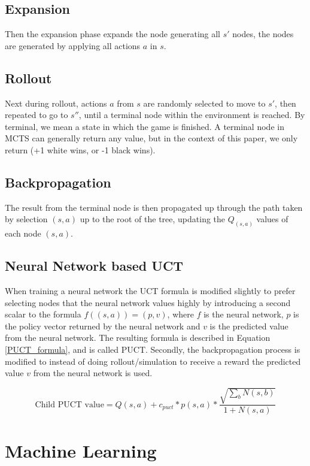 \subsection*{Expansion}
Then the expansion phase expands the node generating all $s'$ nodes, the nodes are generated by applying all actions $a$ in $s$.

\subsection*{Rollout}
Next during rollout, actions $a$ from $s$ are randomly selected to move to $s'$, then repeated to go to $s''$, until a terminal node within the environment is reached. By terminal, we mean a state in which the game is finished. A terminal node in MCTS can generally return any value, but in the context of this paper, we only return (+1 white wins, or -1 black wins).


\subsection*{Backpropagation}
The result from the terminal node is then propagated up through the path taken by selection $(s,a)$ up
to the root of the tree, updating the $Q_{(s,a)}$ values of each node $(s,a)$.

\subsection{Neural Network based UCT}

When training a neural network the UCT formula is modified slightly to prefer selecting nodes
that the neural network values highly by introducing a second scalar to the formula $f((s,a)) = (p,v)$, where $f$ is the neural network, $p$ is the policy vector returned by the neural network and $v$ is the predicted value from the neural network. The resulting formula is described in Equation \ref{PUCT_formula}, and is called PUCT\cite{rosin:puct}. Secondly, the backpropagation process is modified to instead of doing rollout/simulation to receive a reward the predicted value $v$ from the neural network is used.

\begin{equation} \label{PUCT_formula}
	\text{Child PUCT value} = Q(s,a) + c_{puct} * p(s,a) * \frac{\sqrt{\sum_b{N(s,b)}}}{1+N(s,a)}
\end{equation}

\section{Machine Learning}

